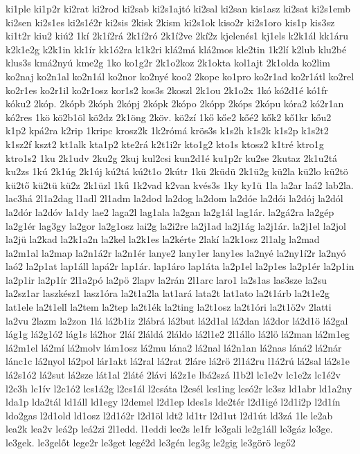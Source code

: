 {ki1ple
ki1p2r
ki2rat
ki2rod
ki2sab
ki2s1ajtó
ki2sal
ki2san
kis1asz
ki2sat
ki2s1emb
ki2sen
ki2s1es
ki2s1é2r
ki2sis
2kisk
2kism
ki2s1ok
kiso2r
ki2s1oro
kis1p
kis3sz
ki1t2r
kiu2
kiú2
1kí
2k1í2rá
2k1í2ró
2k1í2ve
2kí2z
kjelenés1
kj1els
k2k1ál
kk1áru
k2k1e2g
k2k1in
kk1ír
kk1ó2ra
k1k2ri
klá2má
klá2mos
kle2tin
1k2lí
k2lub
klu2bé
klus3s
kmá2nyú
kme2g
1ko
ko1g2r
2k1o2koz
2k1okta
kol1ajt
2k1olda
ko2lim
ko2naj
ko2n1al
ko2n1ál
ko2nor
ko2nyé
koo2
2kope
ko1pro
ko2r1ad
ko2r1átl
ko2rel
ko2r1es
ko2r1il
ko2r1osz
kor1s2
kos3s
2koszl
2k1ou
2k1o2x
1kó
kó2d1é
kó1fr
kóku2
2kóp.
2kópb
2kóph
2kópj
2kópk
2kópo
2kópp
2kóps
2kópu
kóra2
kó2r1an
kó2res
1kö
kö2b1öl
kö2dz
2k1öng
2köv.
kö2zí
1kő
kőe2
kőé2
kők2
kő1kr
kőu2
k1p2
kpá2ra
k2rip
1kripc
krosz2k
1k2rómá
krös3s
k1s2h
k1s2k
k1s2p
k1s2t2
k1sz2f
kszt2
kt1alk
kta1p2
kte2rá
k2t1i2r
kto1g2
kto1s
ktosz2
k1tré
ktro1g
ktro1s2
1ku
2k1udv
2ku2g
2kuj
kul2csi
kun2d1é
ku1p2r
ku2se
2kutaz
2k1u2tá
ku2zs
1kú
2k1úg
2k1új
kú2tá
kú2t1o
2kútr
1kü
2küdü
2k1ü2g
kü2la
kü2lo
kü2tö
kü2tő
kü2tü
kü2z
2k1üzl
1kű
1k2vad
k2van
kvés3s
1ky
ky1ü
1la
la2ar
laá2
lab2la.
lac3há
2l1a2dag
l1adl
2l1adm
la2dod
la2dog
la2dom
la2dóe
la2dói
la2dój
la2dól
la2dór
la2dóv
la1dy
lae2
laga2l
lag1ala
la2gan
la2g1ál
lag1ár.
la2gá2ra
la2gép
la2g1ér
lag3gy
la2gor
la2g1osz
lai2g
la2i2re
la2j1ad
la2j1ág
la2j1ár.
la2j1el
la2jol
la2jü
la2kad
la2k1a2n
la2kel
la2k1es
la2kérte
2lakí
la2k1osz
2l1alg
la2mad
la2m1al
la2map
la2n1á2r
la2n1ér
lanye2
lany1er
lany1es
la2nyé
la2ny1í2r
la2nyó
laó2
la2p1at
lap1áll
lapá2r
lap1ár.
lap1áro
lap1áta
la2p1el
la2p1es
la2p1ér
la2p1in
la2p1ir
la2p1ír
2l1a2pó
la2pö
2lapv
la2rán
2l1arc
laro1
la2s1as
las3sze
la2su
la2sz1ar
laszkész1
lasz1óra
la2t1a2la
lat1ará
lata2t
lat1ato
la2t1árb
la2t1e2g
lat1ele
la2t1ell
la2tem
la2tep
la2t1ék
la2ting
la2t1osz
la2t1óri
la2t1ö2v
2latti
la2vu
2lazm
la2zon
1lá
lá2b1iz
2lábrá
lá2but
lá2d1al
lá2dan
lá2dor
lá2d1ö
lá2gal
lág1g
lá2g1ó2
lág1s
lá2hor
2láí
2láldá
2láldo
lá2l1e2
2l1állo
lá2lö
lá2man
lá2m1eg
lá2m1el
lá2mí
lá2molv
lám1osz
lá2mu
lána2
lá2nal
lá2n1an
lá2nas
láná2
lá2nár
lánc1c
lá2nyol
lá2pol
lár1akt
lá2ral
lá2rat
2láre
lá2rö
2l1á2ru
l1á2rú
lá2sal
lá2s1e
lá2s1ó2
lá2sut
lá2sze
lát1al
2láté
2lávi
lá2z1e
lbá2szá
l1b2l
lc1e2v
lc1e2z
lc1é2v
l2c3h
lc1ív
l2c1ó2
lcs1á2g
l2cs1ál
l2csáta
l2csél
lcs1ing
lcsó2r
lc3sz
ld1abr
ld1a2ny
lda1p
lda2tál
ld1áll
ld1egy
l2demel
l2d1ep
ldes1s
lde2tér
l2d1igé
l2d1i2p
l2d1ín
ldo2gas
l2d1old
ld1osz
l2d1ó2r
l2d1öl
ldt2
ld1tr
l2d1ut
l2d1út
ld3zá
1le
le2ab
lea2k
lea2v
leá2p
leá2zi
2l1edd.
l1eddi
lee2s
le1fr
le3gali
le2g1áll
le3gáz
le3ge.
le3gek.
le3gelőt
lege2r
le3get
legé2d
le3gén
leg3g
le2gig
le3görö
legő2
}
